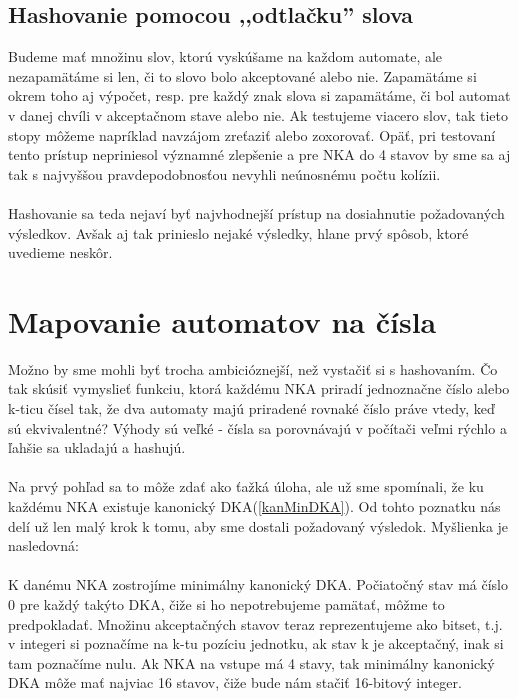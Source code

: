 \subsection{Hashovanie pomocou ,,odtlačku'' slova}
Budeme mať množinu slov, ktorú vyskúšame na každom automate, ale nezapamätáme si len, či to slovo bolo akceptované alebo nie. Zapamätáme si okrem toho aj výpočet, resp. pre každý znak slova si zapamätáme, či bol automat v danej chvíli v akceptačnom stave alebo nie. Ak testujeme viacero slov, tak tieto stopy môžeme napríklad navzájom zreťaziť alebo zoxorovať. Opäť, pri testovaní tento prístup nepriniesol významné zlepšenie a pre NKA do 4 stavov by sme sa aj tak s najvyššou pravdepodobnosťou nevyhli neúnosnému počtu kolízii.

\paragraph{}
Hashovanie sa teda nejaví byť najvhodnejší prístup na dosiahnutie požadovaných výsledkov. Avšak aj tak prinieslo nejaké výsledky, hlane prvý spôsob, ktoré uvedieme neskôr.

\label{mapCis}
\section{Mapovanie automatov na čísla}

Možno by sme mohli byť trocha ambicióznejší, než vystačiť si s hashovaním. Čo tak skúsiť vymyslieť funkciu, ktorá každému NKA priradí jednoznačne číslo alebo k-ticu čísel tak, že dva automaty majú priradené rovnaké číslo práve vtedy, keď sú ekvivalentné? Výhody sú veľké - čísla sa porovnávajú v počítači veľmi rýchlo a ľahšie sa ukladajú a hashujú. 
\paragraph{}
Na prvý pohľad sa to môže zdať ako ťažká úloha, ale už sme spomínali, že ku každému NKA existuje kanonický DKA(\ref{kanMinDKA}). Od tohto poznatku nás delí už len malý krok k tomu, aby sme dostali požadovaný výsledok. Myšlienka je nasledovná:
\paragraph{}
K danému NKA zostrojíme minimálny kanonický DKA. Počiatočný stav má číslo 0 pre každý takýto DKA, čiže si ho nepotrebujeme pamätať, môžme to predpokladať. Množinu akceptačných stavov teraz reprezentujeme ako bitset, t.j. v integeri si poznačíme na k-tu pozíciu jednotku, ak stav k je akceptačný, inak si tam poznačíme nulu. Ak NKA na vstupe má 4 stavy, tak minimálny kanonický DKA môže mať najviac 16 stavov, čiže bude nám stačiť 16-bitový integer. 
